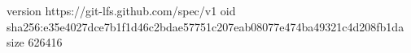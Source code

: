version https://git-lfs.github.com/spec/v1
oid sha256:e35e4027dce7b1f1d46c2bdae57751c207eab08077e474ba49321c4d208fb1da
size 626416
